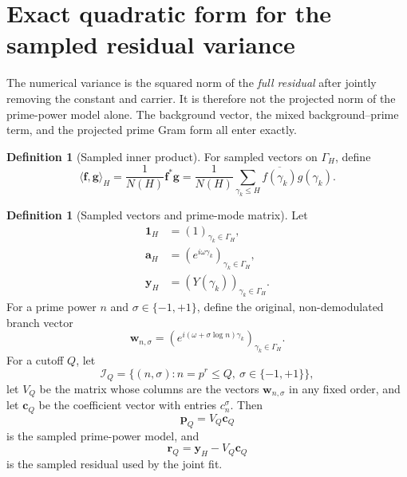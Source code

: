 \documentclass[11pt]{amsart}
\numberwithin{equation}{section}
\theoremstyle{plain}
\theoremstyle{definition}
\newtheorem{definition}[theorem]{Definition}
\theoremstyle{remark}
\newcommand{\1}{\mathbf{1}}
\begin{document}
\section{Exact quadratic form for the sampled residual variance}
\label{sec:exact_variance_form}

The numerical variance is the squared norm of the \emph{full residual}
after jointly removing the constant and carrier.  It is therefore not the
projected norm of the prime-power model alone.  The background vector, the
mixed background--prime term, and the projected prime Gram form all enter
exactly.

\begin{definition}[Sampled inner product]
\label{def:sample_inner_product}
For sampled vectors on $\Gamma_H$, define
\begin{equation}
\langle \mathbf f,\mathbf g\rangle_H
=
\frac1{N(H)}\mathbf f^\ast\mathbf g
=
\frac1{N(H)}\sum_{\gamma_k\leq H}
\overline{f(\gamma_k)}g(\gamma_k).
\label{eq:sample_inner_product}
\end{equation}
\end{definition}

\begin{definition}[Sampled vectors and prime-mode matrix]
\label{def:sampled_variance_vectors}
Let
\begin{align}
\mathbf 1_H
&=
(1)_{\gamma_k\in\Gamma_H},
\label{eq:sampled_one_vector}
\\
\mathbf a_H
&=
(e^{i\omega\gamma_k})_{\gamma_k\in\Gamma_H},
\label{eq:sampled_carrier_vector}
\\
\mathbf y_H
&=
(Y(\gamma_k))_{\gamma_k\in\Gamma_H}.
\label{eq:sampled_background_vector}
\end{align}
For a prime power $n$ and $\sigma\in\{-1,+1\}$, define the original,
non-demodulated branch vector
\begin{equation}
\mathbf w_{n,\sigma}
=
\left(e^{i(\omega+\sigma\log n)\gamma_k}\right)_{\gamma_k\in\Gamma_H}.
\label{eq:original_branch_vector}
\end{equation}
For a cutoff $Q$, let
\begin{equation}
\mathcal I_Q
=
\{(n,\sigma):n=p^r\leq Q,\ \sigma\in\{-1,+1\}\},
\label{eq:branch_index_set}
\end{equation}
let $V_Q$ be the matrix whose columns are the vectors
$\mathbf w_{n,\sigma}$ in any fixed order, and let $\mathbf c_Q$ be the
coefficient vector with entries $c_n^\sigma$.  Then
\begin{equation}
\mathbf p_Q=V_Q\mathbf c_Q
\label{eq:sampled_prime_model_vector}
\end{equation}
is the sampled prime-power model, and
\begin{equation}
\mathbf r_Q=\mathbf y_H-V_Q\mathbf c_Q
\label{eq:sampled_full_residual_vector}
\end{equation}
is the sampled residual used by the joint fit.
\end{definition}
\end{document}

